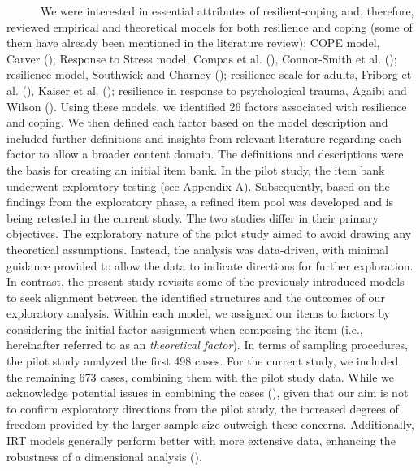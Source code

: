 \documentclass[
  man,floatsintext]{apa7}
\begin{document}
~~~~~~We were interested in essential attributes of resilient-coping and, therefore, reviewed empirical and theoretical models for both resilience and coping (some of them have already been mentioned in the literature review): COPE model, Carver (); Response to Stress model, Compas et al. (), Connor-Smith et al. (); resilience model, Southwick and Charney (); resilience scale for adults, Friborg et al. (), Kaiser et al. (); resilience in response to psychological trauma, Agaibi and Wilson (). Using these models, we identified 26 factors associated with resilience and coping. We then defined each factor based on the model description and included further definitions and insights from relevant literature regarding each factor to allow a broader content domain. The definitions and descriptions were the basis for creating an initial item bank. In the pilot study, the item bank underwent exploratory testing (see \hyperref[appendixa]{Appendix A}). Subsequently, based on the findings from the exploratory phase, a refined item pool was developed and is being retested in the current study. The two studies differ in their primary objectives. The exploratory nature of the pilot study aimed to avoid drawing any theoretical assumptions. Instead, the analysis was data-driven, with minimal guidance provided to allow the data to indicate directions for further exploration. In contrast, the present study revisits some of the previously introduced models to seek alignment between the identified structures and the outcomes of our exploratory analysis. Within each model, we assigned our items to factors by considering the initial factor assignment when composing the item (i.e., hereinafter referred to as an \emph{theoretical factor}). In terms of sampling procedures, the pilot study analyzed the first 498 cases. For the current study, we included the remaining 673 cases, combining them with the pilot study data. While we acknowledge potential issues in combining the cases (), given that our aim is not to confirm exploratory directions from the pilot study, the increased degrees of freedom provided by the larger sample size outweigh these concerns. Additionally, IRT models generally perform better with more extensive data, enhancing the robustness of a dimensional analysis ().
\end{document}
